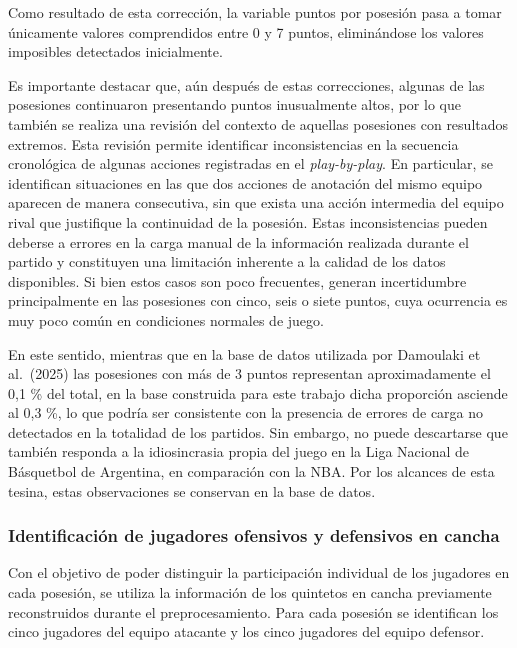 \documentclass[
  12pt,
]{article}
\begin{document}
Como resultado de esta corrección, la variable puntos por posesión pasa
a tomar únicamente valores comprendidos entre 0 y 7 puntos, eliminándose
los valores imposibles detectados inicialmente.

Es importante destacar que, aún después de estas correcciones, algunas
de las posesiones continuaron presentando puntos inusualmente altos, por
lo que también se realiza una revisión del contexto de aquellas
posesiones con resultados extremos. Esta revisión permite identificar
inconsistencias en la secuencia cronológica de algunas acciones
registradas en el \emph{play-by-play}. En particular, se identifican
situaciones en las que dos acciones de anotación del mismo equipo
aparecen de manera consecutiva, sin que exista una acción intermedia del
equipo rival que justifique la continuidad de la posesión. Estas
inconsistencias pueden deberse a errores en la carga manual de la
información realizada durante el partido y constituyen una limitación
inherente a la calidad de los datos disponibles. Si bien estos casos son
poco frecuentes, generan incertidumbre principalmente en las posesiones
con cinco, seis o siete puntos, cuya ocurrencia es muy poco común en
condiciones normales de juego.

En este sentido, mientras que en la base de datos utilizada por
Damoulaki et al.~(2025) las posesiones con más de 3 puntos representan
aproximadamente el 0,1 \% del total, en la base construida para este
trabajo dicha proporción asciende al 0,3 \%, lo que podría ser
consistente con la presencia de errores de carga no detectados en la
totalidad de los partidos. Sin embargo, no puede descartarse que también
responda a la idiosincrasia propia del juego en la Liga Nacional de
Básquetbol de Argentina, en comparación con la NBA. Por los alcances de
esta tesina, estas observaciones se conservan en la base de datos.

\subsubsection{Identificación de jugadores ofensivos y defensivos en
cancha}\label{identificaciuxf3n-de-jugadores-ofensivos-y-defensivos-en-cancha}

Con el objetivo de poder distinguir la participación individual de los
jugadores en cada posesión, se utiliza la información de los quintetos
en cancha previamente reconstruidos durante el preprocesamiento. Para
cada posesión se identifican los cinco jugadores del equipo atacante y
los cinco jugadores del equipo defensor.
\end{document}
